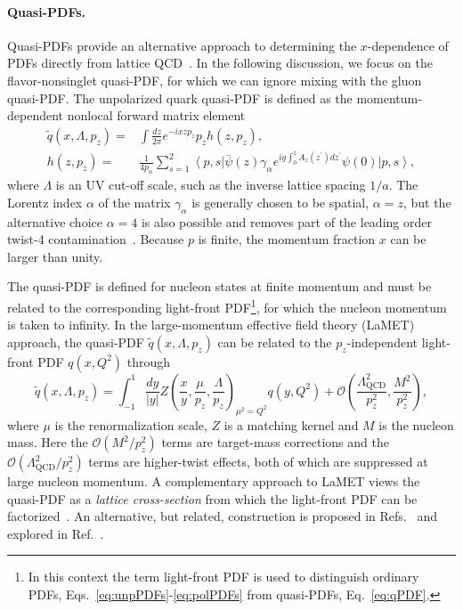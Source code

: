 \paragraph*{Quasi-PDFs.}
Quasi-PDFs provide an alternative approach to determining the $x$-dependence 
of PDFs directly from lattice QCD~\cite{Ji:2013dva,Ji:2014gla}. 
%
In the following discussion, we focus on the flavor-nonsinglet quasi-PDF, 
for which we can ignore mixing with the gluon quasi-PDF. 
%
The unpolarized quark quasi-PDF is defined as the momentum-dependent
nonlocal forward matrix element
\begin{align}\label{eq:qPDF}
\widetilde{q}(x,\Lambda,p_z)  
= {} &  \int \frac{dz}{2\pi} e^{-i x z p_z} p_z h(z,p_z), \nonumber \\
h(z,p_z) 
= {} &
\frac{1}{4 p_{\alpha}}\sum_{s=1}^2\left\langle p,s\right\vert \bar{\psi}(z)\gamma_\alpha e^{ig\int_0^z
A_z(z^\prime) dz^\prime} \psi(0) \left\vert p,s\right\rangle,
\end{align}
%
where $\Lambda$ is an UV cut-off scale, such as the inverse lattice spacing 
$1/a$. 
%
The Lorentz index $\alpha$ of the matrix $\gamma_\alpha$ is generally chosen 
to be spatial, $\alpha = z$, but the alternative choice $\alpha = 4$ is also 
possible and removes part of the leading order twist-4 
contamination~\cite{Xiong:2013bka,Radyushkin:2016hsy}. 
%
Because $p$ is finite, the momentum fraction $x$ can be larger than unity.

The quasi-PDF is defined for nucleon states at finite momentum and must be 
related to the corresponding light-front PDF\footnote{In this context the term 
 light-front PDF is used to distinguish ordinary PDFs, 
 Eqs.~\eqref{eq:unpPDFs}-\eqref{eq:polPDFs} from quasi-PDFs, 
 Eq.~\eqref{eq:qPDF}.}, 
for which the nucleon momentum is taken to infinity.
%
In the  large-momentum  effective field theory (LaMET) approach, the
quasi-PDF $\widetilde{q}(x,\Lambda,p_z)$ can be related to the $p_z$-independent
light-front PDF $q(x,Q^2)$ through~\cite{Ji:2013dva,Ji:2014gla}
\begin{equation} \label{eq:qPDFmatching}
\widetilde{q}(x,\Lambda ,p_z) = 
  \int_{-1}^1 \frac{dy}{\left\vert y\right\vert} 
    Z\left( \frac{x}{y}, \frac{\mu}{p_z}, \frac{\Lambda}{p_z}\right)_{\mu^2 = Q^2} q(y,Q^2) +
  \mathcal{O}\left( \frac{\Lambda_\text{QCD}^2}{p_z^2},\frac{M^2}{p_z^2}\right), 
\end{equation}
where $\mu$ is the renormalization scale,
$Z$ is a matching kernel and $M$ is the nucleon mass.
%
Here the $\mathcal{O}\left(M^2/p_z^2\right)$ terms are target-mass corrections 
and the $\mathcal{O}\left(\Lambda_\text{QCD}^2/p_z^2\right)$ terms are 
higher-twist effects, both of which are suppressed at large nucleon momentum. 
%
A complementary approach to LaMET views the quasi-PDF as a 
{\it lattice cross-section} from which the light-front PDF can be 
factorized~\cite{Ma:2014jla,Ma:2014jga,Ma:2017pxb}.
%
An alternative, but related, construction is proposed in 
Refs.~\cite{Radyushkin:2016hsy,Radyushkin:2017cyf} and explored in 
Ref.~\cite{Orginos:2017kos}.

